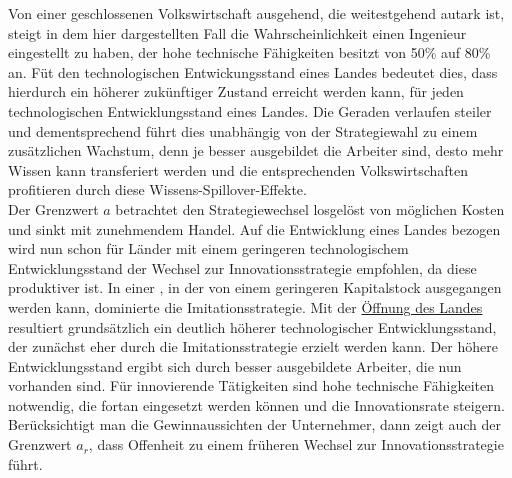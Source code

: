 Von einer geschlossenen Volkswirtschaft ausgehend, die weitestgehend autark ist, steigt in dem hier dargestellten Fall die Wahrscheinlichkeit einen Ingenieur eingestellt zu haben, der hohe technische Fähigkeiten besitzt von 50\% auf 80\% an. Füt den technologischen Entwickungsstand eines Landes bedeutet dies, dass hierdurch ein höherer zukünftiger Zustand erreicht werden kann, für jeden technologischen Entwicklungsstand eines Landes. Die Geraden verlaufen steiler und dementsprechend führt dies unabhängig von der Strategiewahl zu einem zusätzlichen Wachstum, denn je besser ausgebildet die Arbeiter sind, desto mehr Wissen kann transferiert werden und die entsprechenden Volkswirtschaften profitieren durch diese Wissens-Spillover-Effekte.\\ 
Der Grenzwert $\hat{a}$ betrachtet den Strategiewechsel losgelöst von möglichen Kosten und sinkt mit zunehmendem Handel. Auf die Entwicklung eines Landes bezogen wird nun schon für Länder mit einem geringeren technologischem Entwicklungsstand der Wechsel zur \textcolor[rgb]{0.74,0.97,0.22}{Innovationsstrategie} empfohlen, da diese produktiver ist. In einer , in der von einem geringeren Kapitalstock ausgegangen werden kann, dominierte die \textcolor[rgb]{0,0.32,0}{Imitationsstrategie}. Mit der \underline{Öffnung des Landes} resultiert grundsätzlich ein deutlich höherer technologischer Entwicklungsstand, der zunächst eher durch die \textcolor[rgb]{0,0.32,0}{Imitationsstrategie} erzielt werden kann.  Der höhere Entwicklungsstand ergibt sich durch besser ausgebildete Arbeiter, die nun vorhanden sind. Für innovierende Tätigkeiten sind hohe technische Fähigkeiten notwendig, die fortan eingesetzt werden können und die Innovationsrate steigern.\\
Berücksichtigt man die Gewinnaussichten der Unternehmer, dann zeigt auch der Grenzwert $a_r$, dass Offenheit zu einem früheren Wechsel zur Innovationsstrategie führt. \\


